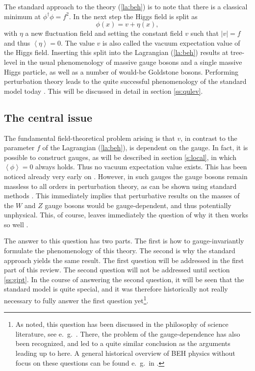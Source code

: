 \documentclass[final,12pt]{article}
\newcommand*{\no}{\noindent}
\newcommand*{\be}{\begin{equation}}
\newcommand*{\ee}{\end{equation}}
\newcommand*{\pref}[1]{(\ref{#1})}
\newcommand*{\1}{1\!\!\!\bot}
\newcommand*{\la}{\left\langle}
\newcommand*{\ra}{\right\rangle}
\begin{document}
The standard approach to the theory \pref{la:beh} \cite{Bohm:2001yx,Weinberg:1996kr} is to note that there is a classical minimum at $\phi^\dagger\phi=f^2$. In the next step the Higgs field is split as 
\be
\phi(x)=v+\eta(x)\label{split},
\ee
\no with $\eta$ a new fluctuation field and setting the constant field $v$ such that $|v|=f$ and thus $\la\eta\ra=0$. The value $v$ is also called the vacuum expectation value of the Higgs field. Inserting this split into the Lagrangian \pref{la:beh} results at tree-level in the usual phenomenology of massive gauge bosons and a single massive Higgs particle, as well as a number of would-be Goldstone bosons. Performing perturbation theory leads to the quite successful phenomenology of the standard model today \cite{pdg}. This will be discussed in detail in section \ref{ss:qulev}.

\subsection{The central issue}

The fundamental field-theoretical problem arising is that $v$, in contrast to the parameter $f$ of the Lagrangian \pref{la:beh}, is dependent on the gauge. In fact, it is possible to construct gauges, as will be described in section \ref{s:local}, in which $\la\phi\ra=0$ always holds. Thus no vacuum expectation value exists. This has been noticed already very early on \cite{Lee:1974zg}. However, in such gauges the gauge bosons remain massless to all orders in perturbation theory, as can be shown using standard methods \cite{Bohm:2001yx}. This immediately implies that perturbative results on the masses of the $W$ and $Z$ gauge bosons would be gauge-dependent, and thus potentially unphysical. This, of course, leaves immediately the question of why it then works so well \cite{pdg}.

The answer to this question has two parts. The first is how to gauge-invariantly formulate the phenomenology of this theory. The second is why the standard approach yields the same result. The first question will be addressed in the first part of this review. The second question will not be addressed until section \ref{ss:gipt}. In the course of answering the second question, it will be seen that the standard model is quite special, and it was therefore historically not really necessary to fully answer the first question yet\footnote{As noted, this question has been discussed in the philosophy of science literature, see e.\ g.\ \cite{Lyre:2008af,Francois:2017aa}. There, the problem of the gauge-dependence has also been recognized, and led to a quite similar conclusion as the arguments leading up to here. A general historical overview of BEH physics without focus on these questions can be found e.\ g.\ in \cite{Borrelli:2015goa}.}.
\end{document}
